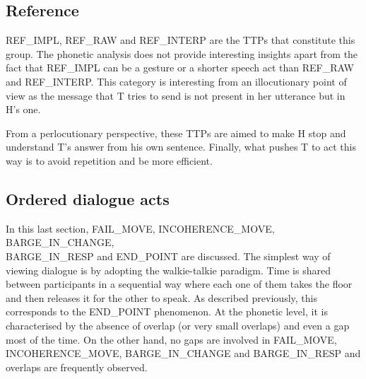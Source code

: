     \subsection{Reference}
		
					REF\_IMPL, REF\_RAW and REF\_INTERP are the TTPs that constitute this group. The phonetic analysis does not provide interesting insights apart from the fact that REF\_IMPL can be a gesture or a shorter speech act than REF\_RAW and REF\_INTERP. This category is interesting from an illocutionary point of view as the message that T tries to send is not present in her utterance but in H's one.
					
					From a perlocutionary perspective, these TTPs are aimed to make H stop and understand T's answer from his own sentence. Finally, what pushes T to act this way is to avoid repetition and be more efficient.

    \subsection{Ordered dialogue acts}

         In this last section, FAIL\_MOVE, INCOHERENCE\_MOVE, BARGE\_IN\_CHANGE,\\ BARGE\_IN\_RESP and END\_POINT are discussed. The simplest way of viewing dialogue is by adopting the walkie-talkie paradigm. Time is shared between participants in a sequential way where each one of them takes the floor and then releases it for the other to speak. As described previously, this corresponds to the END\_POINT phenomenon. At the phonetic level, it is characterised by the absence of overlap (or very small overlaps) and even a gap most of the time. On the other hand, no gaps are involved in FAIL\_MOVE, INCOHERENCE\_MOVE, BARGE\_IN\_CHANGE and BARGE\_IN\_RESP and overlaps are frequently observed.

